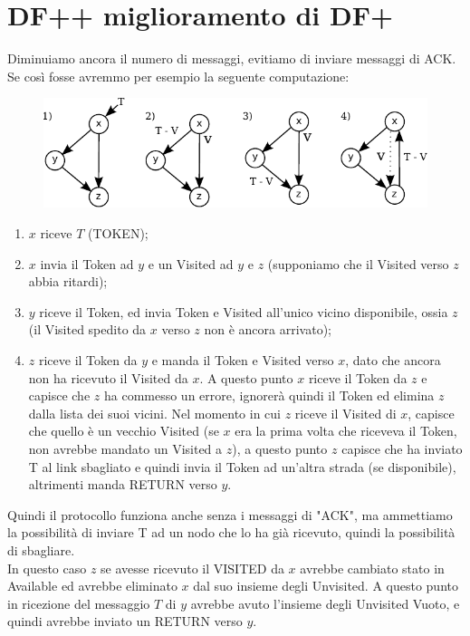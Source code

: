 \section{DF++ miglioramento di DF+}

Diminuiamo ancora il numero di messaggi, evitiamo di inviare messaggi di ACK. Se
così fosse avremmo per esempio la seguente computazione:

\begin{figure}[H]
    \centering
    \includegraphics[width=13cm, keepaspectratio]{capitoli/attraversamento/imgs/n_17}
\end{figure}

\begin{enumerate}
    \item $x$ riceve $T$ (TOKEN);
    \item $x$ invia il Token ad $y$ e un Visited ad $y$ e $z$ (supponiamo che il
          Visited verso $z$ abbia ritardi);
    \item $y$ riceve il Token, ed invia Token e Visited all'unico vicino
          disponibile, ossia $z$ (il Visited spedito da $x$ verso $z$ non è ancora
          arrivato);
    \item $z$ riceve il Token da $y$ e manda il Token e Visited verso $x$, dato
          che ancora non ha ricevuto il Visited da $x$. A questo punto $x$ riceve il
          Token da $z$ e capisce che $z$ ha commesso un errore, ignorerà quindi il Token
          ed elimina $z$ dalla lista dei suoi vicini. Nel momento in cui $z$ riceve il
          Visited di $x$, capisce che quello è un vecchio Visited (se $x$ era la prima
          volta che riceveva il Token, non avrebbe mandato un Visited a $z$), a questo
          punto $z$ capisce che ha inviato T al link sbagliato e quindi invia il Token
          ad un'altra strada (se disponibile), altrimenti manda RETURN verso $y$.
\end{enumerate}
Quindi il protocollo funziona anche senza i messaggi di "ACK", ma ammettiamo la
possibilità di inviare T ad un nodo che lo ha già ricevuto, quindi la
possibilità di sbagliare.\\
In questo caso $z$ se avesse ricevuto il VISITED da $x$ avrebbe cambiato stato
in Available ed avrebbe eliminato $x$ dal suo insieme degli Unvisited. A questo
punto in ricezione del messaggio $T$ di $y$ avrebbe avuto l'insieme degli
Unvisited Vuoto, e quindi avrebbe inviato un RETURN verso $y$.


